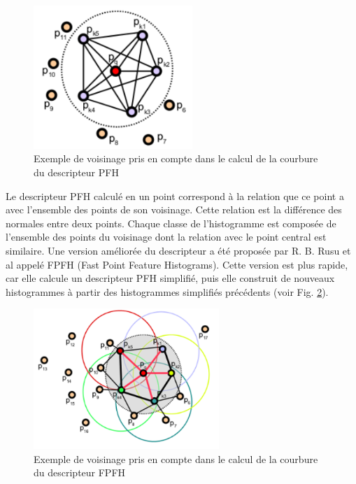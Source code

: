 \begin{figure}[!ht]
  \begin{center}
    \includegraphics[width=6cm]{image/PFH.png}
    \caption{Exemple de voisinage pris en compte dans le calcul de la courbure du descripteur PFH}
    \label{fig:pfhNeighborhood}
  \end{center}
\end{figure}

Le descripteur PFH calculé en un point correspond à la relation que ce point a avec l'ensemble des points de son voisinage. Cette relation
est la différence des normales entre deux points. Chaque classe de l'histogramme est composée de l'ensemble des points du voisinage dont 
la relation avec le point central est similaire. Une version améliorée du descripteur a été proposée par R. B. Rusu et al\cite{FPFH} appelé
FPFH (Fast Point Feature Histograms). Cette version est plus rapide, car elle calcule un descripteur PFH simplifié, puis elle construit
de nouveaux histogrammes à partir des histogrammes simplifiés précédents (voir Fig. \ref{fig:fpfhNeighborhood}).\\

\begin{figure}[!ht]
  \begin{center}
    \includegraphics[width=7cm]{image/FPFH.png}
    \caption{Exemple de voisinage pris en compte dans le calcul de la courbure du descripteur FPFH}
    \label{fig:fpfhNeighborhood}
  \end{center}
\end{figure}

